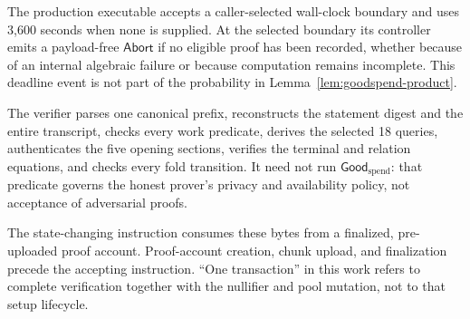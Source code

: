 The production executable accepts a caller-selected wall-clock boundary and
uses 3,600 seconds when none is supplied.  At the selected boundary its
controller emits a payload-free \(\mathsf{Abort}\) if no eligible proof has
been recorded, whether because of an internal algebraic failure or because
computation remains incomplete.  This deadline event is not part of the
probability in Lemma~\ref{lem:goodspend-product}.

The verifier parses one canonical prefix, reconstructs the statement digest
and the entire transcript, checks every work predicate, derives the selected
18 queries, authenticates the five opening sections, verifies the terminal
and relation equations, and checks every fold transition.  It need not run
\(\mathsf{Good}_{\mathrm{spend}}\): that predicate governs the honest prover's privacy
and availability policy, not acceptance of adversarial proofs.

The state-changing instruction consumes these bytes from a finalized,
pre-uploaded proof account.  Proof-account creation, chunk upload, and
finalization precede the accepting instruction.  ``One transaction'' in this
work refers to complete verification together with the nullifier and pool
mutation, not to that setup lifecycle.
